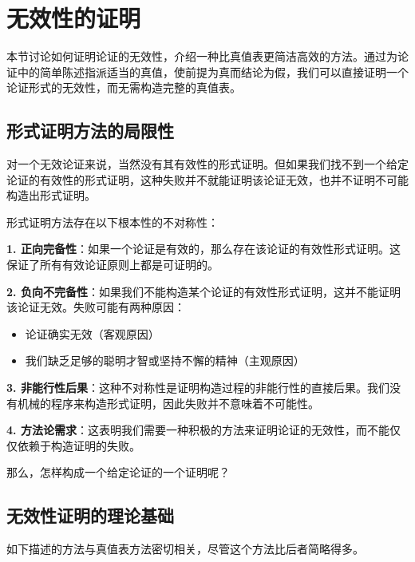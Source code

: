 \section{无效性的证明}

\begin{logicbox}[title=引言]
本节讨论如何证明论证的无效性，介绍一种比真值表更简洁高效的方法。通过为论证中的简单陈述指派适当的真值，使前提为真而结论为假，我们可以直接证明一个论证形式的无效性，而无需构造完整的真值表。
\end{logicbox}

\subsection{形式证明方法的局限性}

对一个无效论证来说，当然没有其有效性的形式证明。但如果我们找不到一个给定论证的有效性的形式证明，这种失败并不就能证明该论证无效，也并不证明不可能构造出形式证明。

\begin{theorembox}[title=形式证明方法的不对称性]
形式证明方法存在以下根本性的不对称性：

\textbf{1. 正向完备性}：如果一个论证是有效的，那么存在该论证的有效性形式证明。这保证了所有有效论证原则上都是可证明的。

\textbf{2. 负向不完备性}：如果我们不能构造某个论证的有效性形式证明，这并不能证明该论证无效。失败可能有两种原因：
\begin{itemize}
\item 论证确实无效（客观原因）
\item 我们缺乏足够的聪明才智或坚持不懈的精神（主观原因）
\end{itemize}

\textbf{3. 非能行性后果}：这种不对称性是证明构造过程的非能行性的直接后果。我们没有机械的程序来构造形式证明，因此失败并不意味着不可能性。

\textbf{4. 方法论需求}：这表明我们需要一种积极的方法来证明论证的无效性，而不能仅仅依赖于构造证明的失败。
\end{theorembox}

那么，怎样构成一个给定论证的一个证明呢？

\subsection{无效性证明的理论基础}

如下描述的方法与真值表方法密切相关，尽管这个方法比后者简略得多。


